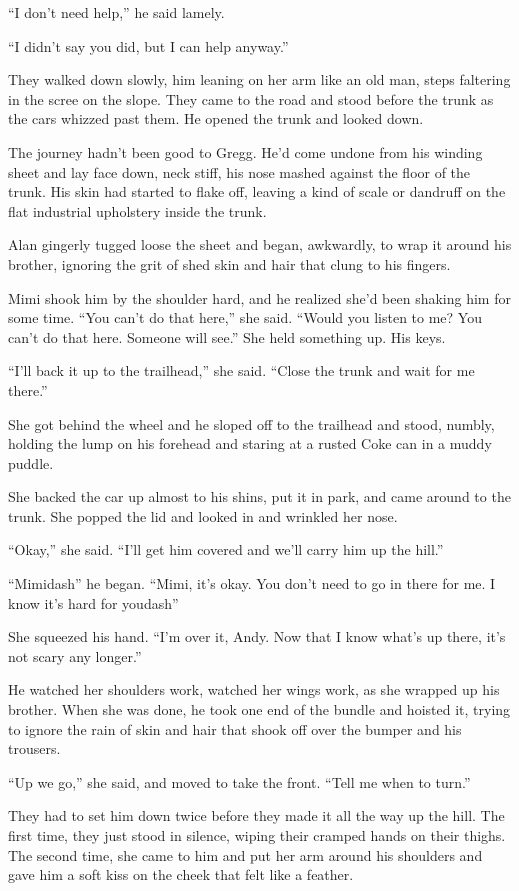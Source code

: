 ``I don't need help,'' he said lamely.

``I didn't say you did, but I can help anyway.''

They walked down slowly, him leaning on her arm like an old man, steps
faltering in the scree on the slope.  They came to the road and stood
before the trunk as the cars whizzed past them.  He opened the trunk
and looked down.

The journey hadn't been good to Gregg.  He'd come undone from his
winding sheet and lay face down, neck stiff, his nose mashed against
the floor of the trunk.  His skin had started to flake off, leaving a
kind of scale or dandruff on the flat industrial upholstery inside the
trunk.

Alan gingerly tugged loose the sheet and began, awkwardly, to wrap it
around his brother, ignoring the grit of shed skin and hair that clung
to his fingers.

Mimi shook him by the shoulder hard, and he realized she'd been
shaking him for some time.  ``You can't do that here,'' she said. 
``Would you listen to me?  You can't do that here.  Someone will
see.'' She held something up.  His keys.

``I'll back it up to the trailhead,'' she said.  ``Close the trunk and
wait for me there.''

She got behind the wheel and he sloped off to the trailhead and stood,
numbly, holding the lump on his forehead and staring at a rusted Coke
can in a muddy puddle.

She backed the car up almost to his shins, put it in park, and came
around to the trunk.  She popped the lid and looked in and wrinkled
her nose.

``Okay,'' she said.  ``I'll get him covered and we'll carry him up the
hill.''

``Mimidash{}'' he began.  ``Mimi, it's okay.  You don't need to go in
there for me.  I know it's hard for youdash{}''

She squeezed his hand.  ``I'm over it, Andy.  Now that I know what's
up there, it's not scary any longer.''

He watched her shoulders work, watched her wings work, as she wrapped
up his brother.  When she was done, he took one end of the bundle and
hoisted it, trying to ignore the rain of skin and hair that shook off
over the bumper and his trousers.

``Up we go,'' she said, and moved to take the front.  ``Tell me when
to turn.''

They had to set him down twice before they made it all the way up the
hill.  The first time, they just stood in silence, wiping their
cramped hands on their thighs.  The second time, she came to him and
put her arm around his shoulders and gave him a soft kiss on the cheek
that felt like a feather.

